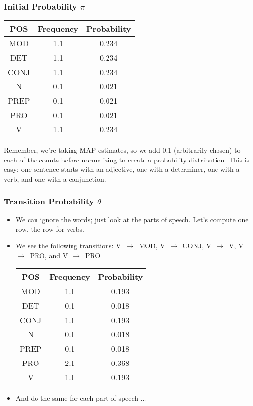 \documentclass{beamer}
\begin{document}
\begin{frame}

\frametitle{Initial Probability $\pi$}

\begin{center}
\begin{tabular}{|c|c|c|}
\hline
POS  & Frequency & Probability \\
\hline
MOD  & 1.1 & 0.234 \\ 
DET   & 1.1 & 0.234 \\ 
CONJ  & 1.1 & 0.234 \\ 
N  & 0.1 & 0.021 \\ 
PREP  & 0.1 & 0.021 \\ 
PRO  & 0.1 & 0.021 \\ 
V  & 1.1 & 0.234 \\ 
\hline
\end{tabular}
\end{center}

Remember, we're taking MAP estimates, so we add 0.1 (arbitrarily chosen) to each of the counts before normalizing to create a probability distribution.  This is easy; one sentence starts with an adjective, one with a determiner, one with a verb, and one with a conjunction.

\end{frame}

\begin{frame}

\frametitle{Transition Probability $\theta$}

\begin{itemize}
\item We can ignore the words; just look at the parts of speech.  Let's compute one row, the row for verbs.
\item We see the following transitions: V~$\rightarrow$~MOD, V~$\rightarrow$~CONJ, V~$\rightarrow$~V, V~$\rightarrow$~PRO, and V~$\rightarrow$~PRO

\begin{center}
\begin{tabular}{|c|c|c|}
\hline
POS  & Frequency & Probability \\
\hline
MOD  & 1.1 & 0.193 \\ 
DET   & 0.1 & 0.018 \\ 
CONJ  & 1.1 & 0.193 \\ 
N  & 0.1 & 0.018 \\ 
PREP  & 0.1 & 0.018 \\ 
PRO  & 2.1 & 0.368 \\ 
V  & 1.1 & 0.193 \\ 
\hline
\end{tabular}
\end{center}

\item And do the same for each part of speech ...
\end{itemize}

\end{frame}
\end{document}
